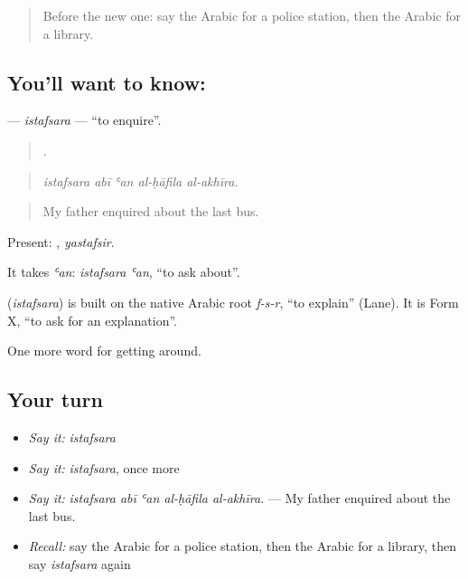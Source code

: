 \begin{quote}
Before the new one: say the Arabic for a police station, then the Arabic for a library.
\end{quote}

\subsection*{You'll want to know: }
\textbf{} — \emph{istafsara} — \textquotedblleft{}to enquire\textquotedblright{}.

\begin{quote}
    .
\end{quote}

\begin{quote}
\emph{istafsara abī ʿan al-ḥāfila al-akhīra.}
\end{quote}

\begin{quote}
My father enquired about the last bus.
\end{quote}

Present: , \emph{yastafsir}.

It takes \emph{ʿan}: \emph{istafsara ʿan}, \textquotedblleft{}to ask about\textquotedblright{}.

\begin{cousinweb}
\textbf{} (\emph{istafsara}) is built on the native Arabic root \emph{f-s-r}, \textquotedblleft{}to explain\textquotedblright{} (Lane). It is Form X, \textquotedblleft{}to ask for an explanation\textquotedblright{}.
\end{cousinweb}

\begin{grammarlens}[title={What you've built}]
One more word for getting around.
\end{grammarlens}

\subsection*{Your turn}
\begin{itemize}
\raggedright
  \item \emph{Say it:} \emph{istafsara}
  \item \emph{Say it:} \emph{istafsara}, once more
  \item \emph{Say it:} \emph{istafsara abī ʿan al-ḥāfila al-akhīra.} — My father enquired about the last bus.
  \item \emph{Recall:} say the Arabic for a police station, then the Arabic for a library, then say \emph{istafsara} again
\end{itemize}

